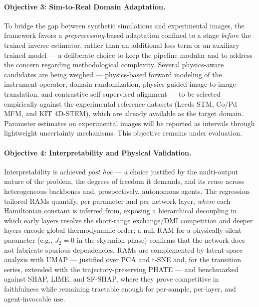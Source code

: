 \documentclass[letterpaper, 12, one column]{article}
\begin{document}
\paragraph{Objective 3: Sim-to-Real Domain Adaptation.}
To bridge the gap between synthetic simulations and experimental images, the framework favors a \emph{preprocessing}-based adaptation confined to a stage \emph{before} the trained inverse estimator, rather than an additional loss term or an auxiliary trained model --- a deliberate choice to keep the pipeline modular and to address the concern regarding methodological complexity. Several physics-aware candidates are being weighed --- physics-based forward modeling of the instrument operator, domain randomization, physics-guided image-to-image translation, and contrastive self-supervised alignment --- to be selected empirically against the experimental reference datasets (Leeds STM, Co/Pd MFM, and KIT 4D-STEM), which are already available as the target domain. Parameter estimates on experimental images will be reported as intervals through lightweight uncertainty mechanisms. This objective remains under evaluation.

\paragraph{Objective 4: Interpretability and Physical Validation.}
Interpretability is achieved \emph{post hoc} --- a choice justified by the multi-output nature of the problem, the degrees of freedom it demands, and its reuse across heterogeneous backbones and, prospectively, autonomous agents. The regression-tailored RAMs quantify, per parameter and per network layer, \emph{where} each Hamiltonian constant is inferred from, exposing a hierarchical decoupling in which early layers resolve the short-range exchange/DMI competition and deeper layers encode global thermodynamic order; a null RAM for a physically silent parameter (e.g., $\tilde{J}_2=0$ in the skyrmion phase) confirms that the network does not fabricate spurious dependencies. RAMs are complemented by latent-space analysis with UMAP --- justified over PCA and t-SNE and, for the transition series, extended with the trajectory-preserving PHATE --- and benchmarked against SHAP, LIME, and SF-SHAP, where they prove competitive in faithfulness while remaining tractable enough for per-sample, per-layer, and agent-invocable use.
\end{document}
